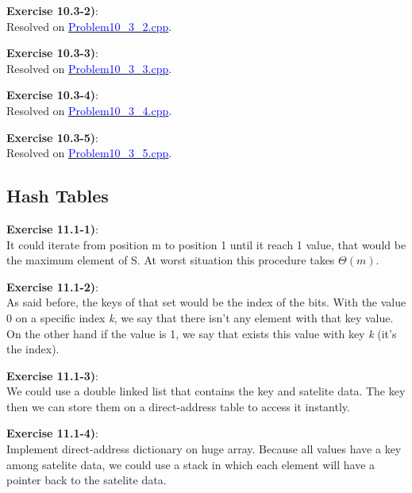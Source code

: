 \documentclass{article}
\newcounter{exercise}[section]   %
\begin{document}
\textbf{Exercise 10.3-2)}:\\
Resolved on \href{https://github.com/Graburr/Algorithms_CLRS_4ed_solutions/tree/main/chapter3/Elementary_DS/Problem10_3_2.cpp}
{\textcolor{Blue}{Problem10\_3\_2.cpp}}.

\textbf{Exercise 10.3-3)}:\\
Resolved on \href{https://github.com/Graburr/Algorithms_CLRS_4ed_solutions/tree/main/chapter3/Elementary_DS/Problem10_3_3.cpp}
{\textcolor{Blue}{Problem10\_3\_3.cpp}}.

\textbf{Exercise 10.3-4)}:\\
Resolved on \href{https://github.com/Graburr/Algorithms_CLRS_4ed_solutions/tree/main/chapter3/Elementary_DS/Problem10_3_4.cpp}
{\textcolor{Blue}{Problem10\_3\_4.cpp}}.

\textbf{Exercise 10.3-5)}:\\
Resolved on \href{https://github.com/Graburr/Algorithms_CLRS_4ed_solutions/tree/main/chapter3/Elementary_DS/Problem10_3_5.cpp}
{\textcolor{Blue}{Problem10\_3\_5.cpp}}.

\subsection{Hash Tables}
\setcounter{exercise}{0}

\textbf{Exercise 11.1-1)}:\\
It could iterate from position m to position 1 until it reach 1 value, that would be the
maximum element of S. At worst situation this procedure takes \(\Theta(m)\).

\textbf{Exercise 11.1-2)}:\\
As said before, the keys of that set would be the index of the bits. With the value 0 on
a specific index \textit{k}, we say that there isn't any element with that key value. On the
other hand if the value is 1, we say that exists this value with key \textit{k} (it's the 
index).

\textbf{Exercise 11.1-3)}:\\
We could use a double linked list that contains the key and satelite data. The key then
we can store them on a direct-address table to access it instantly. 

\textbf{Exercise 11.1-4)}:\\
Implement direct-address dictionary on huge array.
Because all values have a key among satelite data, we could use a stack in which each element
will have a pointer back to the satelite data.
\end{document}
